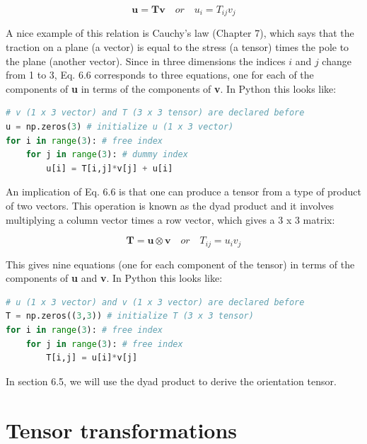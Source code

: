 \documentclass[a4paper , 12pt]{book}
\begin{document}
\begin{equation}
    \mathbf{u}=\mathbf{T}\mathbf{v}\quad or\quad u_i=T_{ij}v_j
\end{equation}

A nice example of this relation is Cauchy's law (Chapter 7), which says that the traction on a plane (a vector) is equal to the stress (a tensor) times the pole to the plane (another vector). Since in three dimensions the indices $i$ and $j$ change from 1 to 3, Eq. 6.6 corresponds to three equations, one for each of the components of \textbf{u} in terms of the components of \textbf{v}. In Python this looks like:

\begin{center}
\begin{lstlisting}[language=Python, frame=single]
# v (1 x 3 vector) and T (3 x 3 tensor) are declared before
u = np.zeros(3) # initialize u (1 x 3 vector)
for i in range(3): # free index
    for j in range(3): # dummy index
        u[i] = T[i,j]*v[j] + u[i]
\end{lstlisting}
\end{center}

An implication of Eq. 6.6 is that one can produce a tensor from a type of product of two vectors. This operation is known as the dyad product and it involves multiplying a column vector times a row vector, which gives a 3 x 3 matrix:

\begin{equation}
    \mathbf{T}=\mathbf{u}\otimes\mathbf{v}\quad or\quad T_{ij}=u_iv_j
\end{equation}

This gives nine equations (one for each component of the tensor) in terms of the components of \textbf{u} and \textbf{v}. In Python this looks like:

\begin{center}
\begin{lstlisting}[language=Python, frame=single]
# u (1 x 3 vector) and v (1 x 3 vector) are declared before
T = np.zeros((3,3)) # initialize T (3 x 3 tensor)
for i in range(3): # free index
    for j in range(3): # free index
        T[i,j] = u[i]*v[j]
\end{lstlisting}
\end{center}

In section 6.5, we will use the dyad product to derive the orientation tensor.

\section{Tensor transformations} \label{tensTransf}
\end{document}
